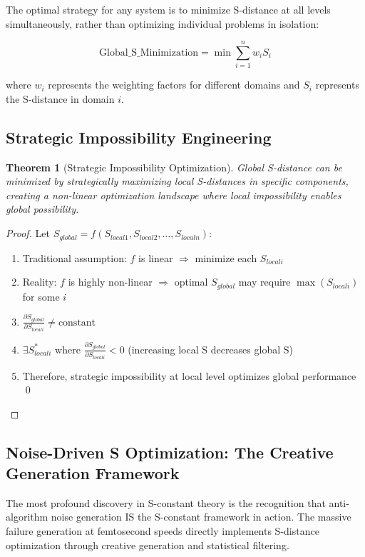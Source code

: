 \documentclass[12pt,a4paper]{article}
\newtheorem{theorem}{Theorem}[section]
\begin{document}
{{{{{{{{{{{{{{The optimal strategy for any system is to minimize S-distance at all levels simultaneously, rather than optimizing individual problems in isolation:

$$\text{Global\_S\_Minimization} = \min \sum_{i=1}^{n} w_i S_i$$

where $w_i$ represents the weighting factors for different domains and $S_i$ represents the S-distance in domain $i$.

\subsection{Strategic Impossibility Engineering}

\begin{theorem}[Strategic Impossibility Optimization]
Global S-distance can be minimized by strategically maximizing local S-distances in specific components, creating a non-linear optimization landscape where local impossibility enables global possibility.
\end{theorem}

\begin{proof}
Let $S_{global} = f(S_{local1}, S_{local2}, \ldots, S_{localn})$:
\begin{enumerate}
\item Traditional assumption: $f$ is linear $\Rightarrow$ minimize each $S_{locali}$
\item Reality: $f$ is highly non-linear $\Rightarrow$ optimal $S_{global}$ may require $\max(S_{locali})$ for some $i$
\item $\frac{\partial S_{global}}{\partial S_{locali}} \neq \text{constant}$
\item $\exists S_{locali}^*$ where $\frac{\partial S_{global}}{\partial S_{locali}} < 0$ (increasing local S decreases global S)
\item Therefore, strategic impossibility at local level optimizes global performance \qed
\end{enumerate}
\end{proof}

\subsection{Noise-Driven S Optimization: The Creative Generation Framework}

The most profound discovery in S-constant theory is the recognition that anti-algorithm noise generation IS the S-constant framework in action. The massive failure generation at femtosecond speeds directly implements S-distance optimization through creative generation and statistical filtering.

}}}}}}}}}}}}}}
\end{document}
